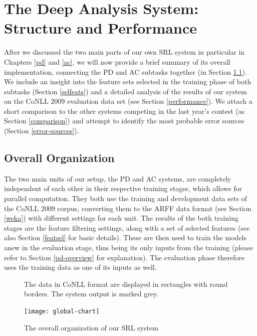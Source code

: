 \documentclass[12pt,notitlepage,a4paper]{report}
\begin{document}
%
%
\chapter{The Deep Analysis System: Structure and Performance}\label{setup}
%
%

After we discussed the two main parts of our own SRL system in particular in Chapters \ref{pd} and \ref{ac}, we will now provide a brief summary of its overall implementation, connecting the PD and AC subtasks together (in Section \ref{overall}). We include an insight into the feature sets selected in the training phase of both subtasks (Section \ref{selfeats}) and a detailed analysis of the results of our system on the CoNLL 2009 evaluation data set (see Section \ref{performance}). We attach a short comparison to the other systems competing in the last year's contest (as Section \ref{comparison}) and attempt to identify the most probable error sources (Section \ref{error-sources}).

\section{Overall Organization}\label{overall}

The two main units of our setup, the PD and AC systems, are completely independent of each other in their respective training stages, which allows for parallel computation. They both use the training and development data sets of the CoNLL 2009 corpus, converting them to the ARFF data format (see Section \ref{weka}) with different settings for each unit. The results of the both training stages are the feature filtering settings, along with a set of selected features (see also Section \ref{featsel} for basic details). These are then used to train the models anew in the evaluation stage, thus being its only inputs from the training (please refer to Section \ref{pd-overview} for explanation). The evaluation phase therefore uses the training data as one of its inputs as well.

\begin{figure}[htb]\footnotesize
\caption{The overall organization of our SRL system}\label{fig:overall}
\noindent The data in CoNLL format are displayed in rectangles with round borders. The system output is marked grey.
\begin{center}
\texttt{[image: global-chart]}
\end{center}
\end{figure}
\end{document}

